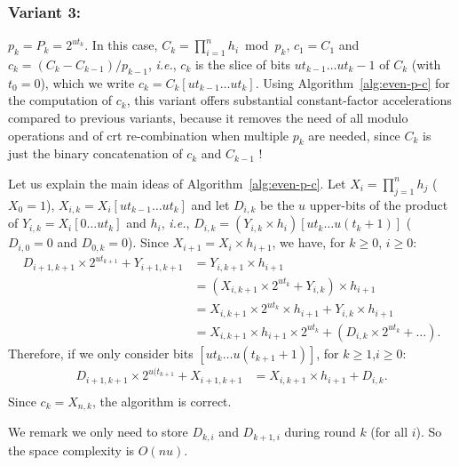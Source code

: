 \documentclass[11pt]{llncs}
\begin{document}
\subsubsection{Variant 3:} $p_k = P_k = 2^{ut_k}$. 
In this case, $C_k = \prod_{i=1}^n h_i \bmod p_k$, $c_1 = C_1$ and $c_k = (C_k - C_{k-1}) / p_{k-1}$, {\it i.e.}, $c_k$ is the slice of bits $ut_{k-1}\dots ut_k-1$ of $C_k$ (with $t_0 = 0$), which we write $c_k = C_k[ut_{k-1}\dots ut_k]$.
Using Algorithm~\ref{alg:even-p-c} for the computation of $c_k$, this variant offers substantial constant-factor accelerations compared to previous variants, because it removes the need of all modulo operations and of {\sc crt} re-combination when multiple $p_k$ are needed, since $C_k$ is just the binary concatenation of $c_k$ and $C_{k-1}$ !

Let us explain the main ideas of Algorithm~\ref{alg:even-p-c}.
Let $X_i = \prod_{j=1}^n h_j$ ($X_0 = 1$), $X_{i,k} = X_i[ut_{k-1}\dots ut_{k}]$ and let $D_{i,k}$ be the $u$ upper-bits of the product of $Y_{i,k} = X_i[0\dots ut_{k}]$ and $h_i$, {\it i.e.}, $D_{i,k} = (Y_{i,k} \times h_i)[ut_k\dots u(t_k+1)]$ ($D_{i,0} = 0$ and $D_{0,k} = 0$).
Since $X_{i+1} = X_i \times h_{i+1}$, we have, for $k \ge 0$, $i \ge 0$:
\begin{align*}
  D_{i+1,k+1} \times 2^{ut_{k+1}} + Y_{i+1,k+1} &= Y_{i,k+1} \times h_{i+1} \\
                 &= (X_{i,k+1} \times 2^{ut_{k}} + Y_{i,k}) \times h_{i+1} \\
                 &= X_{i,k+1} \times 2^{ut_k} \times h_{i+1} + Y_{i,k} \times h_{i+1} \\
                 &= X_{i,k+1}  \times h_{i+1} \times 2^{ut_k} + (D_{i,k} \times 2^{ut_k} + \dots).
\end{align*}
Therefore, if we only consider bits $[ut_k \dots u(t_{k+1}+1)]$, for $k\ge1$,$i\ge0$:
\begin{align*}
  D_{i+1,k+1} \times 2^{u(t_{k+1}} + X_{i+1,k+1} &= X_{i,k+1} \times h_{i+1} + D_{i,k}. \\
\end{align*}
Since $c_k = X_{n,k}$, the algorithm is correct.

We remark we only need to store $D_{k,i}$ and $D_{k+1,i}$ during round $k$ (for all $i$).
So the space complexity is $O(nu)$.
\end{document}
